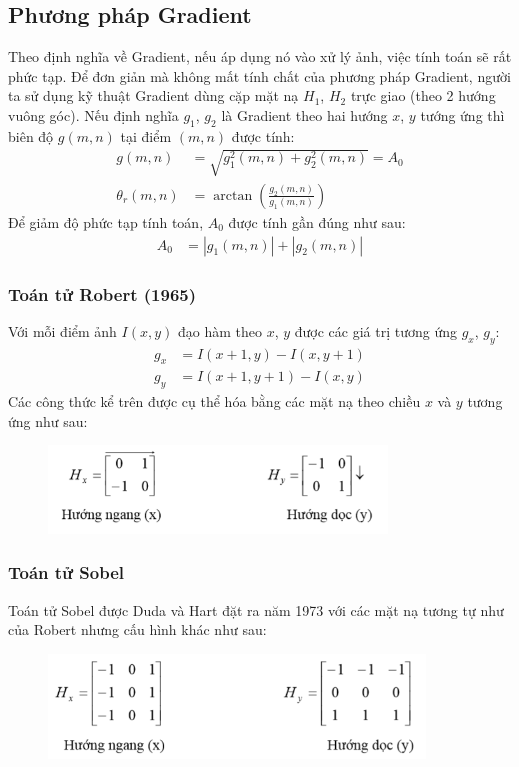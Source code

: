 \documentclass[../report.tex]{subfiles}
\begin{document}
\subsection{Phương pháp Gradient}
Theo định nghĩa về Gradient, nếu áp dụng nó vào xử lý ảnh, 
việc tính toán sẽ rất phức tạp. Để đơn giản mà không 
mất tính chất của phương pháp Gradient, người ta sử 
dụng kỹ thuật Gradient dùng cặp mặt nạ $H_1$, 
$H_2$ trực giao (theo 2 hướng vuông góc). Nếu định nghĩa 
$g_1$, $g_2$ là Gradient theo hai hướng $x$, $y$ tướng ứng thì 
biên độ $g(m,n)$ tại điểm $(m, n)$ được tính: 
\begin{align*}
g(m, n) &= \sqrt{g_1^2(m, n) + g_2^2(m, n)} = A_0 \\
\theta_r(m, n) &= \arctan \left(\frac{g_2(m, n)}{g_1(m, n)}\right)
\end{align*}
Để giảm độ phức tạp tính toán, $A_0$ được tính gần đúng như sau:
\begin{align*}
A_0 &= |g_1(m, n)| + |g_2(m, n)|
\end{align*}

\subsubsection{Toán tử Robert (1965)}
Với mỗi điểm ảnh $I(x,y)$ đạo hàm theo $x$, $y$ 
được các giá trị tương ứng $g_x$, $g_y$:
\begin{align*}
g_x &= I(x + 1, y) - I(x, y + 1) \\
g_y &= I(x + 1, y + 1) - I(x, y)
\end{align*}
Các công thức kể trên được cụ thể hóa bằng 
các mặt nạ theo chiều $x$ và $y$ tương ứng như sau:
\begin{figure}[H]
\centering
\includegraphics[width=9cm]{figures/sobert-operator.png}
\end{figure}
 
\subsubsection{Toán tử Sobel}
Toán tử Sobel được Duda và Hart đặt ra năm 
1973 với các mặt nạ tương tự như của 
Robert nhưng cấu hình khác như sau:
\begin{figure}[H]
\centering
\includegraphics[width=10cm]{figures/sobel-operator.png}
\end{figure}
\end{document}
